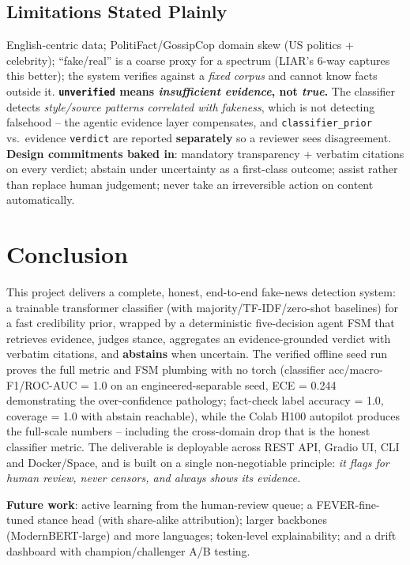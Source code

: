 \documentclass[12pt,a4paper]{article}
\begin{document}
\subsection{Limitations Stated Plainly}

English-centric data; PolitiFact/GossipCop domain skew (US politics + celebrity); ``fake/real'' is a coarse proxy for a spectrum (LIAR's 6-way captures this better); the system verifies against a \emph{fixed corpus} and cannot know facts outside it. \textbf{\texttt{unverified} means \emph{insufficient evidence}, not \emph{true}.} The classifier detects \emph{style/source patterns correlated with fakeness}, which is not detecting falsehood -- the agentic evidence layer compensates, and \texttt{classifier\_prior} vs.\ evidence \texttt{verdict} are reported \textbf{separately} so a reviewer sees disagreement. \textbf{Design commitments baked in}: mandatory transparency + verbatim citations on every verdict; abstain under uncertainty as a first-class outcome; assist rather than replace human judgement; never take an irreversible action on content automatically.

\section{Conclusion}

This project delivers a complete, honest, end-to-end fake-news detection system: a trainable transformer classifier (with majority/TF-IDF/zero-shot baselines) for a fast credibility prior, wrapped by a deterministic five-decision agent FSM that retrieves evidence, judges stance, aggregates an evidence-grounded verdict with verbatim citations, and \textbf{abstains} when uncertain. The verified offline seed run proves the full metric and FSM plumbing with no torch (classifier acc/macro-F1/ROC-AUC = 1.0 on an engineered-separable seed, ECE = 0.244 demonstrating the over-confidence pathology; fact-check label accuracy = 1.0, coverage = 1.0 with abstain reachable), while the Colab H100 autopilot produces the full-scale numbers -- including the cross-domain drop that is the honest classifier metric. The deliverable is deployable across REST API, Gradio UI, CLI and Docker/Space, and is built on a single non-negotiable principle: \emph{it flags for human review, never censors, and always shows its evidence.}

\textbf{Future work}: active learning from the human-review queue; a FEVER-fine-tuned stance head (with share-alike attribution); larger backbones (ModernBERT-large) and more languages; token-level explainability; and a drift dashboard with champion/challenger A/B testing.
\end{document}
